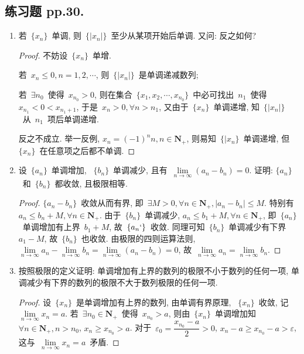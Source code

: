 \documentclass[UTF8,a4paper,10pt,twoside]{book}
\begin{document}
\subsection{练习题 pp.30.}
\begin{enumerate}
	\item 若~$\{x_n\}$~单调, 则~$\{|x_n|\}$~至少从某项开始后单调. 又问: 反之如何?
	      \begin{proof}
		      不妨设~$\{x_n\}$~单增.

		      若~$x_n\leqslant 0, n=1,2,\cdots$, 则~$\{|x_n|\}$~是单调递减数列;

		      若~$\exists n_0$~使得~$x_{n_0}>0$, 则在集合~$\{x_1, x_2,\cdots,x_{n_0}\}$~中必可找出~$n_1$~使得~$x_{n_1}<0<x_{n_1+1}$, 于是~$x_n>0, \forall n>n_1$, 又由于~$\{x_n\}$~单调递增, 知~$\{|x_n|\}$~从~$n_1$~项后单调递增.

		      反之不成立. 举一反例, $x_n=(-1)^nn, n\in\mathbf{N}_{+}$, 则易知~$\{|x_n\}$~单调递增, 但~$\{x_n\}$~在任意项之后都不单调.\qedhere
	      \end{proof}
	\item 设~$\{a_n\}$~单调增加, ~$\{b_n\}$~单调减少, 且有~$\lim\limits_{n\to\infty} (a_n-b_n)=0$. 证明: $\{a_n\}$~和~$\{b_n\}$~都收敛, 且极限相等.
	      \begin{proof}
		      $\{a_n-b_n\}$~收敛从而有界, 即~$\exists M>0, \forall n\in\mathbf{N}_{+}, |a_n-b_n|\leqslant M$. 特别有~$a_n\leqslant b_n+M, \forall n\in\mathbf{N}_{+}$. 由于~$\{b_n\}$~单调减少, $a_n\leqslant b_1+M, \forall n\in\mathbf{N}_{+}$, 即~$\{a_n\}$~单调增加有上界~$b_1+M$, 故~$\{a_n`\}$~收敛. 同理可知~$\{b_n\}$~单调减少有下界~$a_1-M$, 故~$\{b_n\}$~也收敛. 由极限的四则运算法则, $\lim\limits_{n\to\infty} a_n-\lim\limits_{n\to\infty} b_n=\lim\limits_{n\to\infty} (a_n-b_n)=0$, 故~$\lim\limits_{n\to\infty} a_n=\lim\limits_{n\to\infty} b_n$.\qedhere
	      \end{proof}
	\item 按照极限的定义证明: 单调增加有上界的数列的极限不小于数列的任何一项, 单调减少有下界的数列的极限不大于数列极限的任何一项.
	      \begin{proof}
		      设~$\{x_n\}$~是单调增加有上界的数列, 由单调有界原理, ~$\{x_n\}$~收敛, 记~$\lim\limits_{n\to\infty} x_n=a$. 若~$\exists n_0\in\mathbf{N}_{+}$~使得~$x_{n_0}>a$, 则由~$\{x_n\}$~单调增加知~$\forall n\in\mathbf{N}_{+}, n>n_0$, $x_n\geqslant x_{n_0}>a$. 对于~$\varepsilon_0=\dfrac{x_{n_0}-a}{2}>0$, $x_n-a\geqslant x_{n_0}-a>\varepsilon$, 这与~$\lim\limits_{n\to\infty} x_n=a$~矛盾.


\end{proof}
\end{enumerate}
\end{document}

